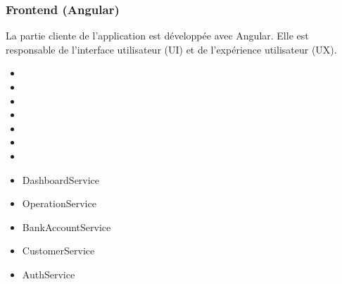 \documentclass[10pt]{article}
\begin{document}
\subsubsection{Frontend (Angular)}


\begin{minipage}{\textwidth}
    \begin{minipage}{0.68\textwidth}
        La partie cliente de l'application est développée avec Angular. Elle est responsable de l'interface 
        utilisateur (UI) et de l'expérience utilisateur (UX).
        
        \vspace{0.5cm}
        \begin{secondarybox}[title=Composants Principaux]
            \begin{itemize}[leftmargin=15pt, itemsep=3pt]
                \item {}
                \item {}
                \item {}
                \item {}
                \item {}
                \item {}
                \item {}
            \end{itemize}
        \end{secondarybox}
    \end{minipage}
    \hfill
    \begin{minipage}{0.28\textwidth}
        \begin{tcolorbox}[
            enhanced,
            colback=primary!5,
            colframe=primary,
            arc=5pt,
            title=Services Angular,
            fonttitle=\small\bfseries\sffamily\color{white},
            coltitle=white,
            colbacktitle=primary
        ]
            \begin{itemize}[leftmargin=12pt, itemsep=2pt, font=\small\sffamily]
                \item DashboardService
                \item OperationService
                \item BankAccountService
                \item CustomerService
                \item AuthService
            \end{itemize}
        \end{tcolorbox}
        

\end{minipage}
\end{minipage}
\end{document}
